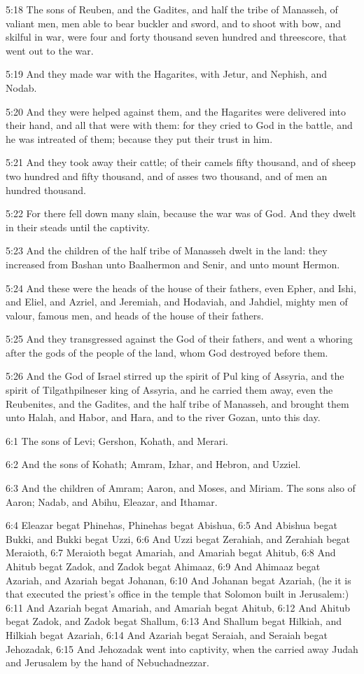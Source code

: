 5:18 The sons of Reuben, and the Gadites, and half the tribe of Manasseh, of valiant men, men able to bear buckler and sword, and to shoot with bow, and skilful in war, were four and forty thousand seven hundred and threescore, that went out to the war.

5:19 And they made war with the Hagarites, with Jetur, and Nephish, and Nodab.

5:20 And they were helped against them, and the Hagarites were delivered into their hand, and all that were with them: for they cried to God in the battle, and he was intreated of them; because they put their trust in him.

5:21 And they took away their cattle; of their camels fifty thousand, and of sheep two hundred and fifty thousand, and of asses two thousand, and of men an hundred thousand.

5:22 For there fell down many slain, because the war was of God. And they dwelt in their steads until the captivity.

5:23 And the children of the half tribe of Manasseh dwelt in the land: they increased from Bashan unto Baalhermon and Senir, and unto mount Hermon.

5:24 And these were the heads of the house of their fathers, even Epher, and Ishi, and Eliel, and Azriel, and Jeremiah, and Hodaviah, and Jahdiel, mighty men of valour, famous men, and heads of the house of their fathers.

5:25 And they transgressed against the God of their fathers, and went a whoring after the gods of the people of the land, whom God destroyed before them.

5:26 And the God of Israel stirred up the spirit of Pul king of Assyria, and the spirit of Tilgathpilneser king of Assyria, and he carried them away, even the Reubenites, and the Gadites, and the half tribe of Manasseh, and brought them unto Halah, and Habor, and Hara, and to the river Gozan, unto this day.

6:1 The sons of Levi; Gershon, Kohath, and Merari.

6:2 And the sons of Kohath; Amram, Izhar, and Hebron, and Uzziel.

6:3 And the children of Amram; Aaron, and Moses, and Miriam. The sons also of Aaron; Nadab, and Abihu, Eleazar, and Ithamar.

6:4 Eleazar begat Phinehas, Phinehas begat Abishua, 6:5 And Abishua begat Bukki, and Bukki begat Uzzi, 6:6 And Uzzi begat Zerahiah, and Zerahiah begat Meraioth, 6:7 Meraioth begat Amariah, and Amariah begat Ahitub, 6:8 And Ahitub begat Zadok, and Zadok begat Ahimaaz, 6:9 And Ahimaaz begat Azariah, and Azariah begat Johanan, 6:10 And Johanan begat Azariah, (he it is that executed the priest's office in the temple that Solomon built in Jerusalem:) 6:11 And Azariah begat Amariah, and Amariah begat Ahitub, 6:12 And Ahitub begat Zadok, and Zadok begat Shallum, 6:13 And Shallum begat Hilkiah, and Hilkiah begat Azariah, 6:14 And Azariah begat Seraiah, and Seraiah begat Jehozadak, 6:15 And Jehozadak went into captivity, when the \LORD carried away Judah and Jerusalem by the hand of Nebuchadnezzar.

